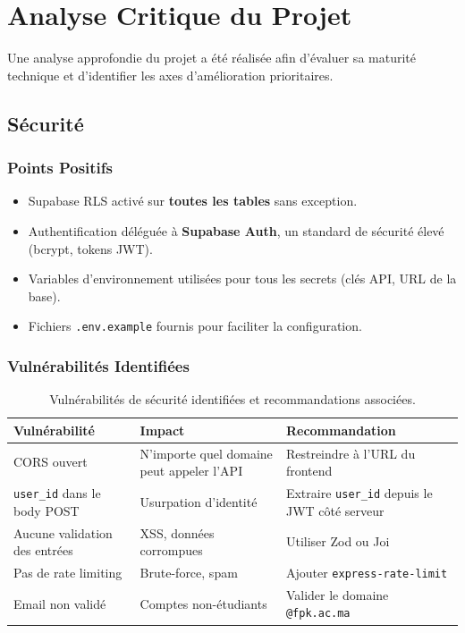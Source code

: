 \documentclass[12pt, a4paper]{report}
\begin{document}
\chapter{Analyse Critique du Projet}

Une analyse approfondie du projet a été réalisée afin d'évaluer sa maturité technique et d'identifier les axes d'amélioration prioritaires.

\section{Sécurité}

\subsection{Points Positifs}

\begin{itemize}
    \item Supabase RLS activé sur \textbf{toutes les tables} sans exception.
    \item Authentification déléguée à \textbf{Supabase Auth}, un standard de sécurité élevé (bcrypt, tokens JWT).
    \item Variables d'environnement utilisées pour tous les secrets (clés API, URL de la base).
    \item Fichiers \texttt{.env.example} fournis pour faciliter la configuration.
\end{itemize}

\subsection{Vulnérabilités Identifiées}

\begin{table}[H]
\centering
\renewcommand{\arraystretch}{1.3}
\begin{tabularx}{\textwidth}{l l X}
\toprule
\textbf{Vulnérabilité} & \textbf{Impact} & \textbf{Recommandation} \\
\midrule
CORS ouvert & N'importe quel domaine peut appeler l'API & Restreindre à l'URL du frontend \\
\texttt{user\_id} dans le body POST & Usurpation d'identité & Extraire \texttt{user\_id} depuis le JWT côté serveur \\
Aucune validation des entrées & XSS, données corrompues & Utiliser Zod ou Joi \\
Pas de rate limiting & Brute-force, spam & Ajouter \texttt{express-rate-limit} \\
Email non validé & Comptes non-étudiants & Valider le domaine \texttt{@fpk.ac.ma} \\
\bottomrule
\end{tabularx}
\caption{Vulnérabilités de sécurité identifiées et recommandations associées.}
\end{table}
\end{document}
